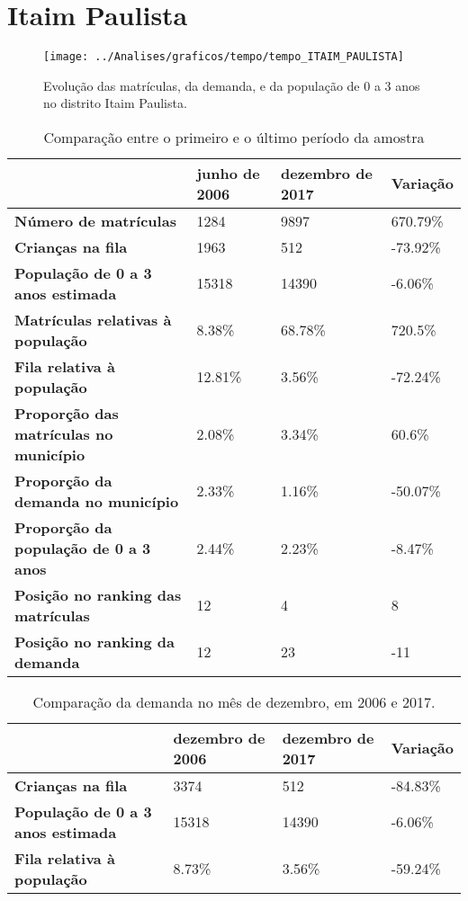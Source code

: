 \section{Itaim Paulista}
\begin{figure}[H]
\centering
\texttt{[image: ../Analises/graficos/tempo/tempo\_ITAIM\_PAULISTA]}
\caption{Evolução das matrículas, da demanda, e da população de 0 a 3 anos no distrito Itaim Paulista.}
\end{figure}
\begin{table}[H]
\begin{tabular}{|l|l|l|l|}
\hline
\textbf{}                                      & \textbf{junho de 2006}       & \textbf{dezembro de 2017}    & \textbf{Variação} \\ \hline
\textbf{Número de matrículas}                  & 1284 & 9897 & 670.79\% \\ \hline
\textbf{Crianças na fila}                      & 1963 & 512 & -73.92\% \\ \hline
\textbf{População de 0 a 3 anos estimada}      & 15318 & 14390 & -6.06\% \\ \hline
\textbf{Matrículas relativas à população}      & 8.38\% & 68.78\% & 720.5\% \\ \hline
\textbf{Fila relativa à população}             & 12.81\% & 3.56\% & -72.24\% \\ \hline
\textbf{Proporção das matrículas no município} & 2.08\% & 3.34\% & 60.6\% \\ \hline
\textbf{Proporção da demanda no município}     & 2.33\% & 1.16\% & -50.07\% \\ \hline
\textbf{Proporção da população de 0 a 3 anos}  & 2.44\% & 2.23\% & -8.47\% \\ \hline
\textbf{Posição no ranking das matrículas}     & 12 & 4 & 8 \\ \hline
\textbf{Posição no ranking da demanda}         & 12 & 23 & -11 \\ \hline
\end{tabular}
\caption{Comparação entre o primeiro e o último período da amostra}
\end{table}
\begin{table}[H]
\begin{tabular}{|l|l|l|l|}
\hline
\textbf{}                                 & \textbf{dezembro de 2006} & \textbf{dezembro de 2017} & \textbf{Variação} \\ \hline
\textbf{Crianças na fila}                      & 3374 & 512 & -84.83\% \\ \hline
\textbf{População de 0 a 3 anos estimada}      & 15318 & 14390 & -6.06\% \\ \hline
\textbf{Fila relativa à população}             & 8.73\% & 3.56\% & -59.24\% \\ \hline
\end{tabular}
\caption{Comparação da demanda no mês de dezembro, em 2006 e 2017.}
\end{table}
